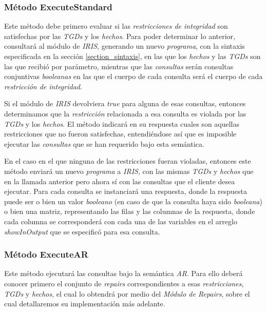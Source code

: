 \documentclass[11pt,a4paper,twoside]{tesis}
\begin{document}
\subsubsection{Método ExecuteStandard}


Este método debe primero evaluar si las \textit{restricciones de integridad} son satisfechas por las \textit{TGDs} y los \textit{hechos}. Para poder determinar lo anterior, consultará al módulo de \textit{IRIS}, generando un nuevo \textit{programa}, con la sintaxis especificada en la sección \ref{section_sintaxis}, en las que los \textit{hechos} y las \textit{TGDs} son las que recibió por parámetro, mientras que las \textit{consultas} serán consultas conjuntivas \textit{booleanas} en las que el cuerpo de cada consulta será el cuerpo de cada \textit{restricción de integridad}. 

Si el módulo de \textit{IRIS} devolviera \textit{true} para alguna de esas consultas, entonces determinamos que la \textit{restricción} relacionada a esa consulta es violada por las \textit{TGDs} y los \textit{hechos}. El método indicará en su respuesta cuales son aquellas restricciones que no fueron satisfechas, entendiéndose así que es imposible ejecutar las \textit{consultas} que se han requerido bajo esta semántica.

En el caso en el que ninguna de las restricciones fueran violadas, entonces este método enviará un nuevo \textit{programa} a \textit{IRIS}, con las mismas \textit{TGDs} y \textit{hechos} que en la llamada anterior pero ahora sí con las consultas que el cliente desea ejecutar. Para cada consulta se instanciará una respuesta, donde la respuesta puede ser o bien un valor \textit{booleano} (en caso de que la consulta haya sido \textit{booleana}) o bien una matriz, representando las filas y las columnas de la respuesta, donde cada columna se corresponderá con cada una de las variables en el arreglo \textit{showInOutput} que se especificó para esa consulta.

\subsubsection{Método ExecuteAR}

Este método ejecutará las consultas bajo la semántica \textit{AR}. Para ello deberá conocer primero el conjunto de \textit{repairs} correspondientes a esas \textit{restricciones}, \textit{TGDs} y \textit{hechos}, el cual lo obtendrá por medio del \textit{Módulo de Repairs}, sobre el cual detallaremos su implementación más adelante. 
\end{document}
